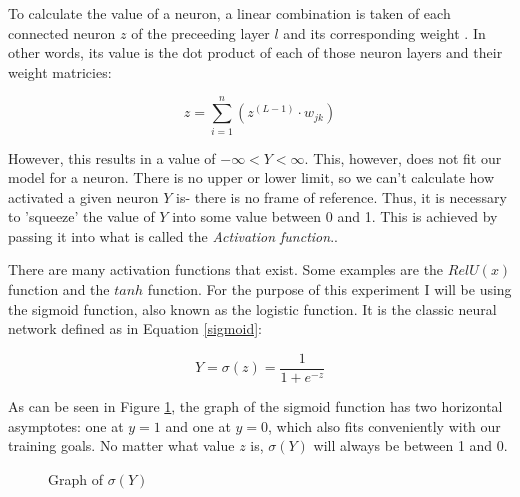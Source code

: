 \documentclass[12pt]{article}
\begin{document}
To calculate the value of a neuron, a linear combination is taken of each connected neuron $z$ of the preceeding layer $l$ and its corresponding weight \textcite{sharma2017}. In other words, its value is the dot product of each of those neuron layers and their weight matricies:

\begin{equation} \label{forwardpropequation}
    z = \sum_{i=1}^{n}(z^{(L-1)} \cdot  w_{jk})
\end{equation}

However, this results in a value of \begin{math} -\infty < Y < \infty \end{math}. This, however, does not fit our model for a neuron. There is no upper or lower limit, so we can't calculate how activated a given neuron \(Y\) is- there is no frame of reference. Thus, it is necessary to 'squeeze' the value of \(Y\) into some value between 0 and 1. This is achieved by passing it into what is called the \textit{Activation function}.\textcite{sharma2017}.

There are many activation functions that exist. Some examples are the \(RelU(x)\) function and the \(tanh\) function. For the purpose of this experiment I will be using the sigmoid function, also known as the logistic function. It is the classic neural network \textcite{DeepLearningCh2} defined as in Equation \ref{sigmoid}:

\begin{equation} \label{sigmoid}
    Y = \sigma(z) = \frac{1}{1 + e ^ {-z}}
\end{equation}


As can be seen in Figure \ref{sigmoidgraph}, the graph of the sigmoid function has two horizontal asymptotes: one at \(y = 1\) and one at \(y = 0\), which also fits conveniently with our training goals. No matter what value $z$ is, \(\sigma(Y)\) will always be between 1 and 0.

\begin{figure}[h]
    \centering
    \caption{Graph of $\sigma(Y)$} \label{sigmoidgraph}
\end{figure}
\end{document}
